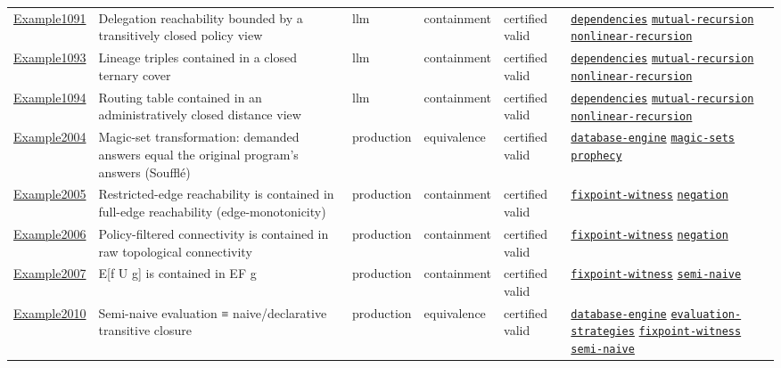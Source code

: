 \documentclass[10pt]{article}
\begin{document}
\begin{longtable}{@{}lp{}p{}p{}p{}p{}@{}}
\hyperref[case:Example1091]{Example1091} & Delegation reachability bounded by a transitively closed policy view & llm & containment & certified valid & {\scriptsize \hyperref[tag:dependencies]{\texttt{dependencies}} \hyperref[tag:mutual-recursion]{\texttt{mutual-recursion}} \hyperref[tag:nonlinear-recursion]{\texttt{nonlinear-recursion}}} \\
\hyperref[case:Example1093]{Example1093} & Lineage triples contained in a closed ternary cover & llm & containment & certified valid & {\scriptsize \hyperref[tag:dependencies]{\texttt{dependencies}} \hyperref[tag:mutual-recursion]{\texttt{mutual-recursion}} \hyperref[tag:nonlinear-recursion]{\texttt{nonlinear-recursion}}} \\
\hyperref[case:Example1094]{Example1094} & Routing table contained in an administratively closed distance view & llm & containment & certified valid & {\scriptsize \hyperref[tag:dependencies]{\texttt{dependencies}} \hyperref[tag:mutual-recursion]{\texttt{mutual-recursion}} \hyperref[tag:nonlinear-recursion]{\texttt{nonlinear-recursion}}} \\
\hyperref[case:Example2004]{Example2004} & Magic-set transformation: demanded answers equal the original program's answers (Soufflé) & production & equivalence & certified valid & {\scriptsize \hyperref[tag:database-engine]{\texttt{database-engine}} \hyperref[tag:magic-sets]{\texttt{magic-sets}} \hyperref[tag:prophecy]{\texttt{prophecy}}} \\
\hyperref[case:Example2005]{Example2005} & Restricted-edge reachability is contained in full-edge reachability (edge-monotonicity) & production & containment & certified valid & {\scriptsize \hyperref[tag:fixpoint-witness]{\texttt{fixpoint-witness}} \hyperref[tag:negation]{\texttt{negation}}} \\
\hyperref[case:Example2006]{Example2006} & Policy-filtered connectivity is contained in raw topological connectivity & production & containment & certified valid & {\scriptsize \hyperref[tag:fixpoint-witness]{\texttt{fixpoint-witness}} \hyperref[tag:negation]{\texttt{negation}}} \\
\hyperref[case:Example2007]{Example2007} & E[f U g] is contained in EF g & production & containment & certified valid & {\scriptsize \hyperref[tag:fixpoint-witness]{\texttt{fixpoint-witness}} \hyperref[tag:semi-naive]{\texttt{semi-naive}}} \\
\hyperref[case:Example2010]{Example2010} & Semi-naive evaluation ≡ naive/declarative transitive closure & production & equivalence & certified valid & {\scriptsize \hyperref[tag:database-engine]{\texttt{database-engine}} \hyperref[tag:evaluation-strategies]{\texttt{evaluation-strategies}} \hyperref[tag:fixpoint-witness]{\texttt{fixpoint-witness}} \hyperref[tag:semi-naive]{\texttt{semi-naive}}} \\

\end{longtable}
\end{document}
